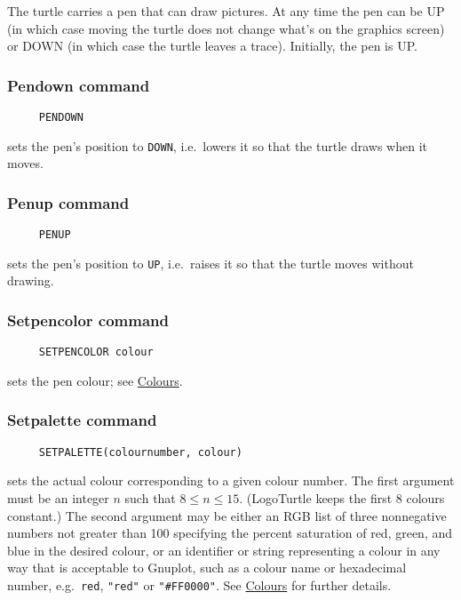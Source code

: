 The turtle carries a pen that can draw pictures.  At any time the pen
can be UP (in which case moving the turtle does not change what's on the
graphics screen) or DOWN (in which case the turtle leaves a trace).
Initially, the pen is UP.

\subsubsection*{Pendown command}
\begin{verbatim}
     PENDOWN
\end{verbatim}
sets the pen's position to \texttt{DOWN}, i.e.\ lowers it so that the
turtle draws when it moves.

\subsubsection*{Penup command}
\begin{verbatim}
     PENUP
\end{verbatim}
sets the pen's position to \texttt{UP}, i.e.\ raises it so that the
turtle moves without drawing.

\subsubsection*{Setpencolor command}
\begin{verbatim}
     SETPENCOLOR colour
\end{verbatim}
\label{logoturtle:setpencolor}
sets the pen colour; see \hyperref[logoturtle:Colours]{Colours}.

\hypertarget{logoturtle:setpalette}{\subsubsection*{Setpalette command}}
\begin{verbatim}
     SETPALETTE(colournumber, colour)
\end{verbatim}
sets the actual colour corresponding to a given colour number.  The
first argument must be an integer $n$ such that $8 \le n \le
15$. (LogoTurtle keeps the first 8 colours constant.)  The second
argument may be either an RGB list of three nonnegative numbers not
greater than 100 specifying the percent saturation of red, green, and
blue in the desired colour, or an identifier or string representing a
colour in any way that is acceptable to Gnuplot, such as a colour name
or hexadecimal number, e.g.\ \texttt{red}, \texttt{"red"} or
\texttt{"\#FF0000"}.  See \hyperref[logoturtle:Colours]{Colours} for
further details.

